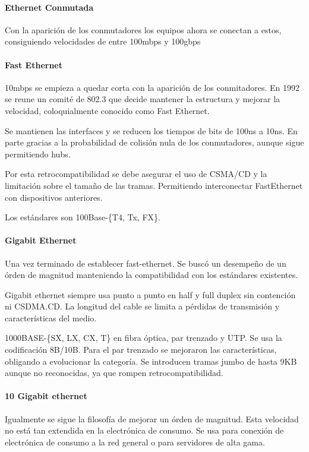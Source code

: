         \paragraph{Ethernet Conmutada} %
            Con la aparición de los conmutadores los equipos ahora se conectan a estos, consiguiendo velocidades de entre 100mbps y 100gbps

        \paragraph{Fast Ethernet} %
            10mbps se empieza a quedar corta con la aparición de los conmitadores. En 1992 se reune un comité de 802.3 que decide mantener la estructura y mejorar la velocidad, coloquialmente conocido como Fast Ethernet.

            Se mantienen las interfaces y se reducen los tiempos de bits de 100ns a 10ns. En parte gracias a la probabilidad de colisión nula de los conmutadores, aunque sigue permitiendo hubs.

            Por esta retrocompatibilidad se debe asegurar el uso de CSMA/CD y la limitación sobre el tamaño de las tramas. Permitiendo interconectar FastEthernet con dispositivos  anteriores.

            Los estándares son 100Base-\{T4, Tx, FX\}.

        \paragraph{Gigabit Ethernet} %
            Una vez terminado de establecer fast-ethernet. Se buscó un desempeño de un órden de magnitud manteniendo la compatibilidad con los estándares existentes.

            Gigabit ethernet siempre usa punto a punto en half y full duplex sin contención ni CSDMA.CD. La longitud del cable se limita a pérdidas de transmisión y características del medio.

            1000BASE-\{SX, LX, CX, T\} en fibra óptica, par trenzado y UTP. Se usa la codificación 8B/10B. Para el par trenzado se mejoraron las características, obligando a evolucionar la categoría. Se introducen tramas jumbo de hasta 9KB aunque no reconocidas, ya que rompen retrocompatibilidad.

        \paragraph{10 Gigabit ethernet} %
            Igualmente se sigue la filosofía de mejorar un órden de magnitud. Esta velocidad no está tan extendida en la electrónica de consumo. Se usa para conexión de electrónica de consumo a la red general o para servidores de alta gama.

